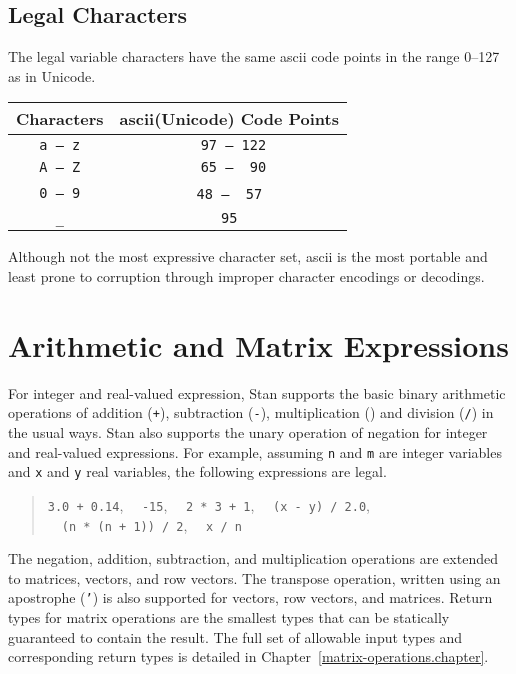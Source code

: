 \documentclass[10pt]{report}
\newcommand{\Stan}{Stan\xspace}
\newcommand{\acronym}[1]{{\sc #1}\xspace}
\newcommand{\ASCII}{\acronym{ascii}}
\newcommand{\code}[1]{{\tt #1}}
\newcommand{\refchapter}[1]{Chapter~\ref{#1.chapter}}
\begin{document}
\subsection{Legal Characters}

The legal variable characters have the same \ASCII code points in the
range 0--127 as in Unicode.
%
\begin{center}
\begin{tabular}{cc}
Characters  & \ASCII (Unicode) Code Points
\\ \hline
\code{a -- z} & \code{{}~97 -- 122}
\\
\code{A -- Z} & \code{{}~65 -- {}~90}
\\
\code{0 -- 9} & \code{{}~48 -- {}~57}\
\\
\code{\_} & \code{95}
\end{tabular}
\end{center}
%
Although not the most expressive character set, \ASCII is the most
portable and least prone to corruption through improper character
encodings or decodings.

\section{Arithmetic and Matrix Expressions}

For integer and real-valued expression, \Stan supports the basic
binary arithmetic operations of addition (\code{+}), subtraction
(\code{-}), multiplication (\code{*}) and division (\code{/}) in the
usual ways.  \Stan also supports the unary operation of negation for
integer and real-valued expressions.  For example, assuming \code{n}
and \code{m} are integer variables and \code{x} and \code{y} real
variables, the following expressions are legal.
\begin{quote}
\code{3.0 + 0.14}, 
\ \ \code{-15},
\ \ \code{2 * 3 + 1}, 
\ \ \code{(x - y) / 2.0},
\\
\ \ \code{(n * (n + 1)) / 2},
\ \ \code{x / n}
\end{quote}
%
The negation, addition, subtraction, and multiplication operations are
extended to matrices, vectors, and row vectors.  The transpose
operation, written using an apostrophe (\code{'}) is also supported
for vectors, row vectors, and matrices.  Return types for matrix
operations are the smallest types that can be statically guaranteed to
contain the result.  The full set of allowable input types and
corresponding return types is detailed in
\refchapter{matrix-operations}.
\end{document}
